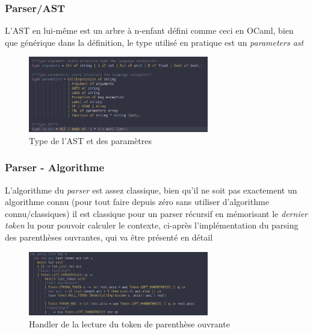 \documentclass{beamer}
\begin{document}
    \begin{frame}
        \frametitle{Parser/AST}

        L'AST en lui-même est un arbre à n-enfant défini comme ceci en OCaml, bien que générique dans la définition, 
        le type utilisé en pratique est un \textit{parameters ast} 
        \begin{figure}[H]
            \center
            \includegraphics[width=0.7\textwidth]{img/type.png}
            \caption{Type de l'AST et des paramètres}
        \end{figure}
    \end{frame}

    \begin{frame}
        \frametitle{Parser - Algorithme}
        L'algorithme du \textit{parser} est assez classique, bien qu'il ne soit pas exactement un algorithme connu (pour tout faire depuis
        zéro sans utiliser d'algorithme connu/classiques) il est classique pour un parser récursif en mémorisant le \textit{dernier token} lu
        pour pouvoir calculer le contexte, ci-après l'implémentation du parsing des parenthèses ouvrantes, qui va être présenté en détail
        \begin{figure}[H]
            \center
            \includegraphics[width=0.7\textwidth]{img/parenth.png}
            \caption{Handler de la lecture du token de parenthèse ouvrante}
        \end{figure}
    \end{frame}
\end{document}

